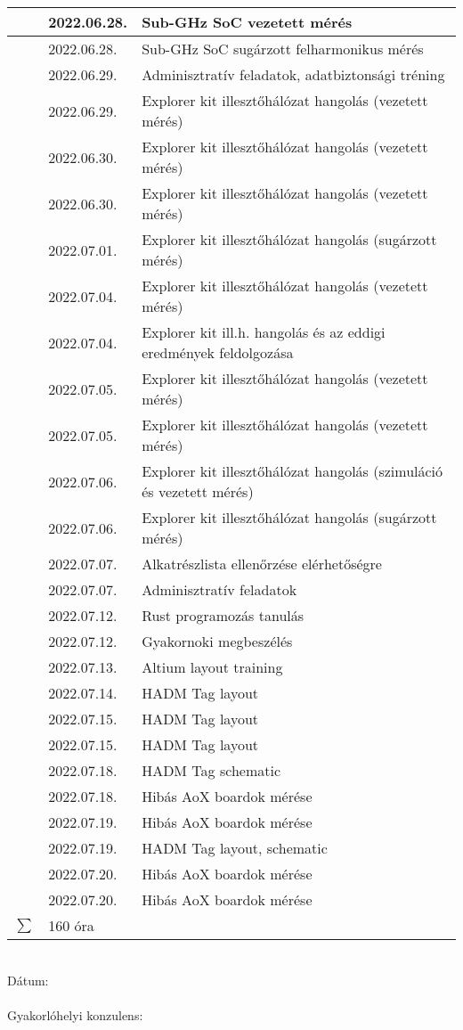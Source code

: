 \documentclass[10pt,a4paper,oneside]{report}
\newcounter{magicrownumbers}
\newcommand\rownum{\stepcounter{magicrownumbers}\arabic{magicrownumbers}}
\begin{document}
\begin{table}[h!]
\begin{tabular}{| c | p{3 cm} | p{10 cm} |}
	\rownum & 2022.06.28. & Sub-GHz SoC vezetett mérés \\ \hline
	\rownum & 2022.06.28. & Sub-GHz SoC sugárzott felharmonikus mérés \\ \hline
	\rownum & 2022.06.29. & Adminisztratív feladatok, adatbiztonsági tréning \\ \hline
	\rownum & 2022.06.29. & Explorer kit illesztőhálózat hangolás (vezetett mérés) \\ \hline
	\rownum & 2022.06.30. & Explorer kit illesztőhálózat hangolás (vezetett mérés) \\ \hline
	\rownum & 2022.06.30. & Explorer kit illesztőhálózat hangolás (vezetett mérés) \\ \hline
	\rownum & 2022.07.01. & Explorer kit illesztőhálózat hangolás (sugárzott mérés) \\ \hline
	\rownum & 2022.07.04. & Explorer kit illesztőhálózat hangolás (vezetett mérés) \\ \hline
	\rownum & 2022.07.04. & Explorer kit ill.h. hangolás és az eddigi eredmények feldolgozása \\ \hline
	\rownum & 2022.07.05. & Explorer kit illesztőhálózat hangolás (vezetett mérés) \\ \hline
	\rownum & 2022.07.05. & Explorer kit illesztőhálózat hangolás (vezetett mérés) \\ \hline
	\rownum & 2022.07.06. & Explorer kit illesztőhálózat hangolás (szimuláció és vezetett mérés) \\ \hline
	\rownum & 2022.07.06. & Explorer kit illesztőhálózat hangolás (sugárzott mérés) \\ \hline
	\rownum & 2022.07.07. & Alkatrészlista ellenőrzése elérhetőségre \\ \hline
	\rownum & 2022.07.07. & Adminisztratív feladatok \\ \hline
	\rownum & 2022.07.12. & Rust programozás tanulás \\ \hline
	\rownum & 2022.07.12. & Gyakornoki megbeszélés \\ \hline
	\rownum & 2022.07.13. & Altium layout training \\ \hline
	\rownum & 2022.07.14. & HADM Tag layout \\ \hline
	\rownum & 2022.07.15. & HADM Tag layout \\ \hline
	\rownum & 2022.07.15. & HADM Tag layout \\ \hline
	\rownum & 2022.07.18. & HADM Tag schematic \\ \hline
	\rownum & 2022.07.18. & Hibás AoX boardok mérése \\ \hline
	\rownum & 2022.07.19. & Hibás AoX boardok mérése \\ \hline
	\rownum & 2022.07.19. & HADM Tag layout, schematic \\ \hline
	\rownum & 2022.07.20. & Hibás AoX boardok mérése \\ \hline
	\rownum & 2022.07.20. & Hibás AoX boardok mérése \\ \hline
	$\sum$ & 160 óra& \\ \hline
	\end{tabular}
\end{table}
\vspace{1 cm} \\
Dátum: \\
\vspace{.5 cm} \\
Gyakorlóhelyi konzulens:
\end{document}
